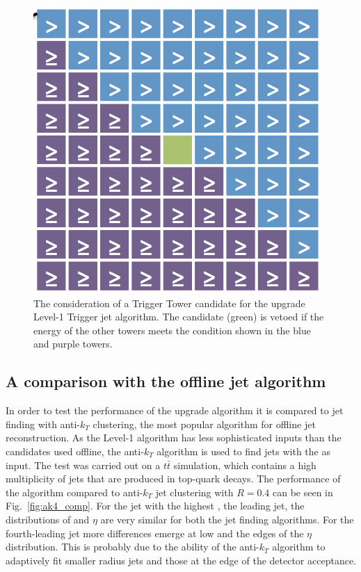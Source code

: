 \begin{figure}
	\begin{center}
		\includegraphics[width=0.4\linewidth]{figs/trigger/stage2_jetalgo}
  \end{center} \caption{The consideration of a Trigger Tower candidate
  for the upgrade Level-1 Trigger jet algorithm. The candidate (green)
  is vetoed if the energy of the other towers meets the condition
  shown in the blue and purple towers.}
	\label{fig:stage2_jetalgo}
\end{figure}

\subsection{A comparison with the offline jet algorithm}

In order to test the performance of the upgrade algorithm it is compared to
jet finding with anti-$k_T$ clustering, the most popular algorithm
for offline jet reconstruction. As the Level-1 algorithm has less
sophisticated inputs than the \PF candidates used offline, the
anti-$k_T$ algorithm is used to find jets with the \TTs as input. The test was
carried out on a $t\bar{t}$ \MC simulation, which contains a high
multiplicity of jets that are produced in top-quark decays. The performance of
the algorithm compared to anti-$k_T$ jet clustering with $R=0.4$ can
be seen in Fig.~\ref{fig:ak4_comp}. For the jet with the highest \pT,
the leading jet, the distributions of \pT and $\eta$ are very similar
for both the jet finding algorithms. For the fourth-leading jet more
differences emerge at low \pT and the edges of the $\eta$
distribution. This is probably due to the ability of the anti-$k_T$
algorithm to adaptively fit smaller radius jets and those at the edge
of the detector acceptance.

